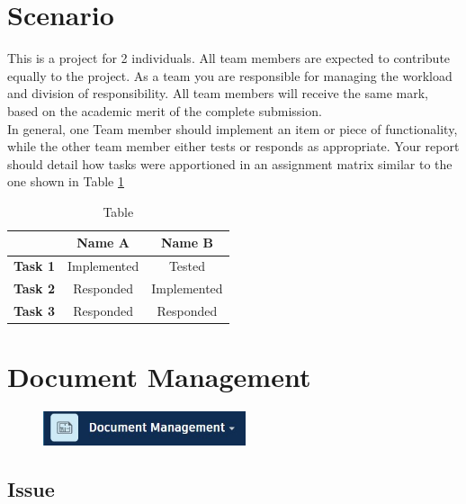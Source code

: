 \section*{Scenario}



This is a project for 2 individuals. All team members are expected to contribute equally to the project. As a team you are responsible for managing the workload and division of responsibility. All team members will receive the same mark, based on the academic merit of the complete submission.\\


In general, one Team member should implement an item or piece of functionality, while the other team member either tests or responds as appropriate.  Your report should detail how tasks were apportioned in an assignment matrix similar to the one shown in Table \ref{tab:AM}

\begin{table}[ht]
	\centering
	\begin{tabular}{|l|c|c|}
		\hline
		& \textbf{Name A} & \textbf{Name B} \\
		\hline
		\textbf{Task 1} & Implemented & Tested \\
		\hline
		\textbf{Task 2} & Responded & Implemented  \\
		\hline
		\textbf{Task 3} & Responded & Responded  \\
		\hline
		
	\end{tabular}
	\caption{Table }
	\label{tab:AM}
\end{table}







\section{Document Management}

\begin{figure}[h!t]
	\includegraphics[height=1.0cm]{RevitAssets/docmgmt}
	\label{fig:docmgmt}
\end{figure}





\subsection{Issue}

